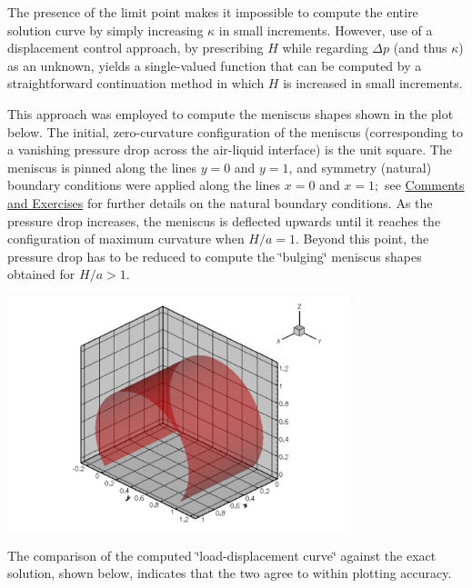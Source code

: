 The presence of the limit point makes it impossible to compute the entire solution curve by simply increasing $ \kappa $ in small increments. However, use of a displacement control approach, by prescribing $ H $ while regarding $ \Delta p $ (and thus $\kappa$) as an unknown, yields a single-\/valued function that can be computed by a straightforward continuation method in which $ H $ is increased in small increments.

This approach was employed to compute the meniscus shapes shown in the plot below. The initial, zero-\/curvature configuration of the meniscus (corresponding to a vanishing pressure drop across the air-\/liquid interface) is the unit square. The meniscus is pinned along the lines $ y=0 $ and $ y=1 $, and symmetry (natural) boundary conditions were applied along the lines $ x=0 $ and $ x=1; $ see \hyperlink{index_comm_ex}{Comments and Exercises} for further details on the natural boundary conditions. As the pressure drop increases, the meniscus is deflected upwards until it reaches the configuration of maximum curvature when $ H/a=1 $. Beyond this point, the pressure drop has to be reduced to compute the \char`\"{}bulging\char`\"{} meniscus shapes obtained for $ H/a > 1. $

 
\begin{DoxyImage}
\includegraphics[width=0.75\textwidth]{barrel}
\end{DoxyImage}


The comparison of the computed \char`\"{}load-\/displacement curve\char`\"{} against the exact solution, shown below, indicates that the two agree to within plotting accuracy.

